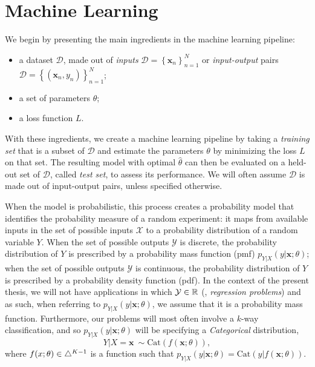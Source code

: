 \section{Machine Learning}
\label{sec:ml-primer}

\noindent We begin by presenting the main ingredients in the machine learning pipeline:
%
\begin{itemize}
    \item a dataset $\mathcal{D}$, made out of
          \textit{inputs} $\mathcal{D}=\left\{\bm{x}_n\right\}_{n=1}^N$ or
          \textit{input-output} pairs
          $\mathcal{D}=\left\{(\bm{x}_n,y_n)\right\}_{n=1}^N$;
    \item a set of parameters $\theta$;
    \item a loss function $L$.
\end{itemize}
%
With these ingredients, we create a machine learning pipeline by
taking a \textit{training set} that is a subset of $\mathcal{D}$ and estimate
the parameters $\theta$ by minimizing the loss
$L$ on that set. The resulting model with optimal
$\hat{\theta}$ can then be evaluated on a held-out set of
$\mathcal{D}$, called \textit{test set}, to assess its performance.
We will often assume $\mathcal D$ is made out of input-output pairs,
unless specified otherwise.

When the model is probabilistic, this process creates a probability
model that identifies the probability measure of a random experiment:
it maps from available inputs in the set of possible inputs
$\mathcal{X}$ to a probability distribution of a random variable $Y$. When the set of
possible outputs $\mathcal{Y}$ is discrete, the probability
distribution of $Y$ is prescribed by a probability mass function
(pmf) $p_{Y|X}(y|\bm{x};\theta)$; when the set of possible outputs
$\mathcal{Y}$ is continuous, the probability distribution of $Y$ is
prescribed by a probability density function (pdf). In the context of
the present thesis, we will not have applications in which
$\mathcal{Y}\in\mathbb{R}$ (\ie, \textit{regression problems}) and as
such, when referring to $p_{Y|X}(y|\bm{x};\theta)$, we assume that it is a
probability mass function. Furthermore, our problems will most often
involve a $k$-way classification, and so $p_{Y|X}(y|\bm{x};\theta)$ will be
specifying a \textit{Categorical} distribution,
%
\begin{equation}
    Y|X\!\!=\!\bm{x}~\sim \text{Cat}(f(\bm{x}; \theta)),
\end{equation}
%
where $f(x; \theta) \in \triangle^{K-1}$ is a function such that
$p_{Y|X}(y|\bm{x};\theta)=\text{Cat}(y|f(\bm{x}; \theta))$.

